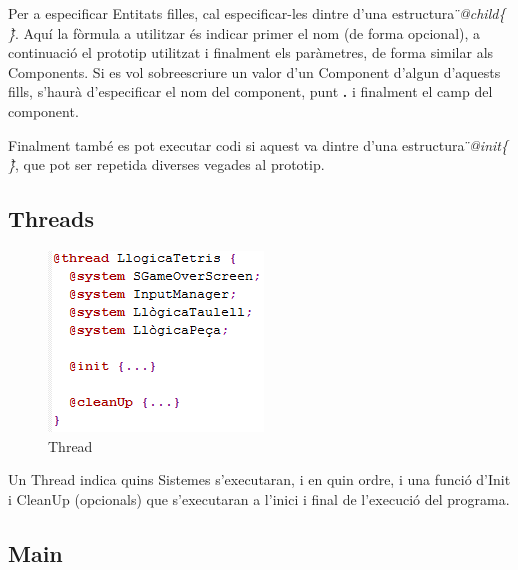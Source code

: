Per a especificar Entitats filles, cal especificar-les dintre d'una estructura {\em\"{}@child\{ \}\"{}}. Aquí la fòrmula a utilitzar és indicar primer el nom (de forma opcional), a continuació el prototip utilitzat i finalment els paràmetres, de forma similar als Components. Si es vol sobreescriure un valor d'un Component d'algun d'aquests fills, s'haurà d'especificar el nom del component, punt {\bf .} i finalment el camp del component.

Finalment també es pot executar codi si aquest va dintre d'una estructura {\em\"{}@init\{ \}\"{}}, que pot ser repetida diverses vegades al prototip.

\subsection{Threads}

%  
%  

\begin{figure}[h!]
  \includegraphics{./img/ExempleThread.png}
  \caption{Thread}
\end{figure}

Un Thread indica quins Sistemes s'executaran, i en quin ordre, i una funció d'Init i CleanUp (opcionals) que s'executaran a l'inici i final de l'execució del programa.

\subsection{Main}

%  
%  

